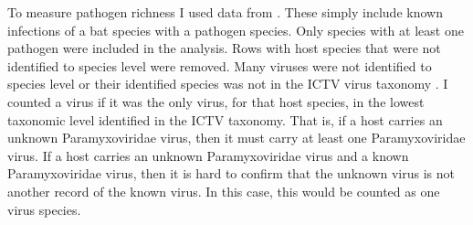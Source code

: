 
























































To measure pathogen richness I used data from \cite{luis2013comparison}. 
These simply include known infections of a bat species with a pathogen species. 
Only species with at least one pathogen were included in the analysis.
Rows with host species that were not identified to species level were removed.
Many viruses were not identified to species level or their identified species was not in the ICTV virus taxonomy \cite{ICTV}.
I counted a virus if it was the only virus, for that host species, in the lowest taxonomic level identified in the ICTV taxonomy.
That is, if a host carries an unknown Paramyxoviridae virus, then it must carry at least one Paramyxoviridae virus.
If a host carries an unknown Paramyxoviridae virus and a known Paramyxoviridae virus, then it is hard to confirm that the unknown virus is not another record of the known virus.
In this case, this would be counted as one virus species.






